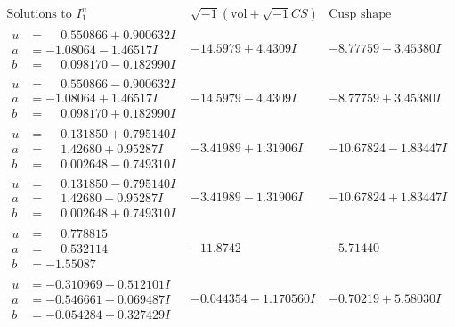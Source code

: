 \documentclass[1p]{elsarticle_modified}
\theoremstyle{definition}
\newcommand{\I}{\sqrt{-1}}
\begin{document}
$$\begin{array}{c|c|c}  
\text{Solutions to }I^u_{1}& \I (\text{vol} + \sqrt{-1}CS) & \text{Cusp shape}\\
 \hline 
\begin{aligned}
u &= \phantom{-}0.550866 + 0.900632 I \\
a &= -1.08064 - 1.46517 I \\
b &= \phantom{-}0.098170 - 0.182990 I\end{aligned}
 & -14.5979 + 4.4309 I & -8.77759 - 3.45380 I \\ \hline\begin{aligned}
u &= \phantom{-}0.550866 - 0.900632 I \\
a &= -1.08064 + 1.46517 I \\
b &= \phantom{-}0.098170 + 0.182990 I\end{aligned}
 & -14.5979 - 4.4309 I & -8.77759 + 3.45380 I \\ \hline\begin{aligned}
u &= \phantom{-}0.131850 + 0.795140 I \\
a &= \phantom{-}1.42680 + 0.95287 I \\
b &= \phantom{-}0.002648 - 0.749310 I\end{aligned}
 & -3.41989 + 1.31906 I & -10.67824 - 1.83447 I \\ \hline\begin{aligned}
u &= \phantom{-}0.131850 - 0.795140 I \\
a &= \phantom{-}1.42680 - 0.95287 I \\
b &= \phantom{-}0.002648 + 0.749310 I\end{aligned}
 & -3.41989 - 1.31906 I & -10.67824 + 1.83447 I \\ \hline\begin{aligned}
u &= \phantom{-}0.778815\phantom{ +0.000000I} \\
a &= \phantom{-}0.532114\phantom{ +0.000000I} \\
b &= -1.55087\phantom{ +0.000000I}\end{aligned}
 & -11.8742\phantom{ +0.000000I} & -5.71440\phantom{ +0.000000I} \\ \hline\begin{aligned}
u &= -0.310969 + 0.512101 I \\
a &= -0.546661 + 0.069487 I \\
b &= -0.054284 + 0.327429 I\end{aligned}
 & -0.044354 - 1.170560 I & -0.70219 + 5.58030 I \\ \hline\begin{aligned}

\end{aligned}
\end{array}$$
\end{document}
